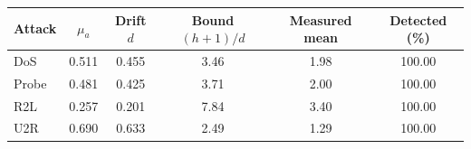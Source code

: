 \begin{tabular}{lccccc}
\toprule
Attack & $\mu_a$ & Drift $d$ & Bound $(h+1)/d$ & Measured mean & Detected (\%) \\
\midrule
DoS & 0.511 & 0.455 & 3.46 & 1.98 & 100.00 \\
Probe & 0.481 & 0.425 & 3.71 & 2.00 & 100.00 \\
R2L & 0.257 & 0.201 & 7.84 & 3.40 & 100.00 \\
U2R & 0.690 & 0.633 & 2.49 & 1.29 & 100.00 \\
\bottomrule
\end{tabular}
